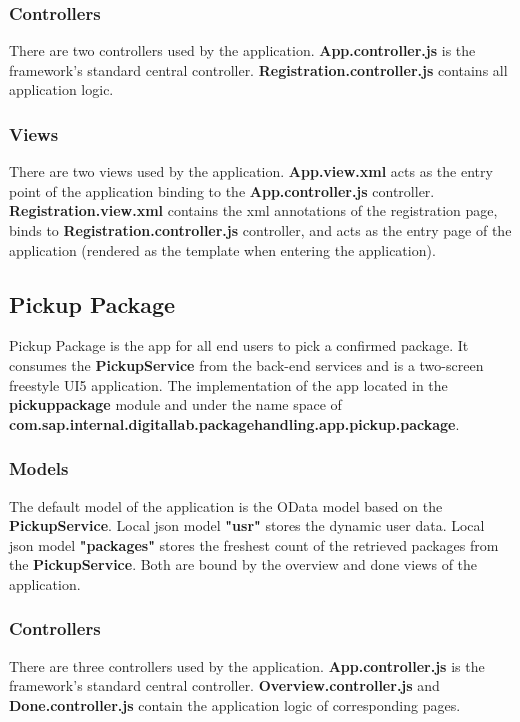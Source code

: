 \subsubsection{Controllers}
There are two controllers used by the application. \textbf{App.controller.js} is the framework's standard central controller. \textbf{Registration.controller.js} contains all application logic.

\subsubsection{Views}
There are two views used by the application. \textbf{App.view.xml} acts as the entry point of the application binding to the \textbf{App.controller.js} controller. \textbf{Registration.view.xml} contains the xml annotations of the registration page, binds to \textbf{Registration.controller.js} controller, and acts as the entry page of the application (rendered as the template when entering the application).

\subsection{Pickup Package}

Pickup Package is the app for all end users to pick a confirmed package. It consumes the \textbf{PickupService} from the back-end services and is a two-screen freestyle UI5 application. The implementation of the app located in the \textbf{pickuppackage} module and under the name space of \textbf{com.sap.internal.digitallab.packagehandling.app.pickup.package}.

\subsubsection{Models}
The default model of the application is the OData model based on the \textbf{PickupService}. Local json model \textbf{"usr"} stores the dynamic user data. Local json model \textbf{"packages"} stores the freshest count of the retrieved packages from the \textbf{PickupService}. Both are bound by the overview and done views of the application.

\subsubsection{Controllers}
There are three controllers used by the application. \textbf{App.controller.js} is the framework's standard central controller. \textbf{Overview.controller.js} and \textbf{Done.controller.js} contain the application logic of corresponding pages.

